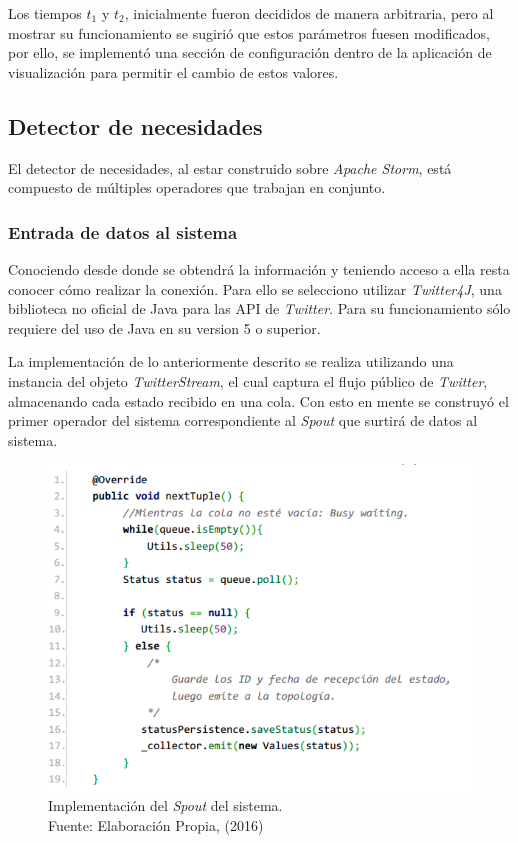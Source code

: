 Los tiempos $t_{1}$ y $t_{2}$, inicialmente fueron decididos de manera arbitraria, pero al mostrar su funcionamiento se sugirió que estos parámetros fuesen modificados, por ello, se implementó una sección de configuración dentro de la aplicación de visualización para permitir el cambio de estos valores.

\subsection{Detector de necesidades}
\label{subsec:detectorNecesidades}

El detector de necesidades, al estar construido sobre \textit{Apache Storm}, está compuesto de múltiples operadores que trabajan en conjunto.

\subsubsection*{Entrada de datos al sistema}
\label{subsubseC:EntradaDeDatos}

Conociendo desde donde se obtendrá la información y teniendo acceso a ella resta conocer cómo realizar la conexión. Para ello se selecciono utilizar \textit{Twitter4J}, una biblioteca no oficial de Java para las API de \textit{Twitter}. Para su funcionamiento sólo requiere del uso de Java en su version 5 o superior.

La implementación de lo anteriormente descrito se realiza utilizando una instancia del objeto \textit{TwitterStream}, el cual captura el flujo público de \textit{Twitter}, almacenando cada estado recibido en una cola. Con esto en mente se construyó el primer operador del sistema correspondiente al \textit{Spout} que surtirá de datos al sistema.

\begin{figure}[H]
	\centering
	\captionsetup{justification=centering}
	\includegraphics[scale=0.8]{images/TwitterSpout.png}
	\caption[Implementación del \textit{Spout} del sistema.]{Implementación del \textit{Spout} del sistema.\\Fuente: Elaboración Propia, (2016)}
	\label{fig:TwitterSpout}
\end{figure}

